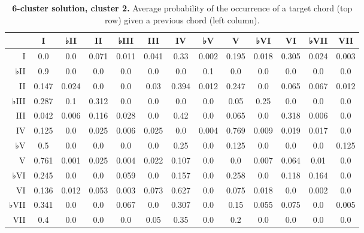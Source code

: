 \begin{table}[htbp]
\begin{minipage}{\linewidth}
\setlength{\tymax}{0.5\linewidth}
\centering
\small
\caption{\textbf{6-cluster solution, cluster 2.} Average probability of the occurrence of a target chord (top row) given a previous chord (left column).}
\label{6-clustersolutioncluster2.averageprobabilityoftheoccurrenceofatargetchordtoprowgivenapreviouschordleftcolumn.}
\begin{tabulary}{\textwidth}{@{}RCCCCCCCCCCCC@{}} \toprule
&I&♭II&II&♭III&III&IV&♭V&V&♭VI&VI&♭VII&VII\\
\midrule
I&0.0&0.0&0.071&0.011&0.041&0.33&0.002&0.195&0.018&0.305&0.024&0.003\\
♭II&0.9&0.0&0.0&0.0&0.0&0.0&0.1&0.0&0.0&0.0&0.0&0.0\\
II&0.147&0.024&0.0&0.0&0.03&0.394&0.012&0.247&0.0&0.065&0.067&0.012\\
♭III&0.287&0.1&0.312&0.0&0.0&0.0&0.0&0.05&0.25&0.0&0.0&0.0\\
III&0.042&0.006&0.116&0.028&0.0&0.42&0.0&0.065&0.0&0.318&0.006&0.0\\
IV&0.125&0.0&0.025&0.006&0.025&0.0&0.004&0.769&0.009&0.019&0.017&0.0\\
♭V&0.5&0.0&0.0&0.0&0.0&0.25&0.0&0.125&0.0&0.0&0.0&0.125\\
V&0.761&0.001&0.025&0.004&0.022&0.107&0.0&0.0&0.007&0.064&0.01&0.0\\
♭VI&0.245&0.0&0.0&0.059&0.0&0.157&0.0&0.258&0.0&0.118&0.164&0.0\\
VI&0.136&0.012&0.053&0.003&0.073&0.627&0.0&0.075&0.018&0.0&0.002&0.0\\
♭VII&0.341&0.0&0.0&0.067&0.0&0.307&0.0&0.15&0.055&0.075&0.0&0.005\\
VII&0.4&0.0&0.0&0.0&0.05&0.35&0.0&0.2&0.0&0.0&0.0&0.0\\

\bottomrule

\end{tabulary}
\end{minipage}
\end{table}

